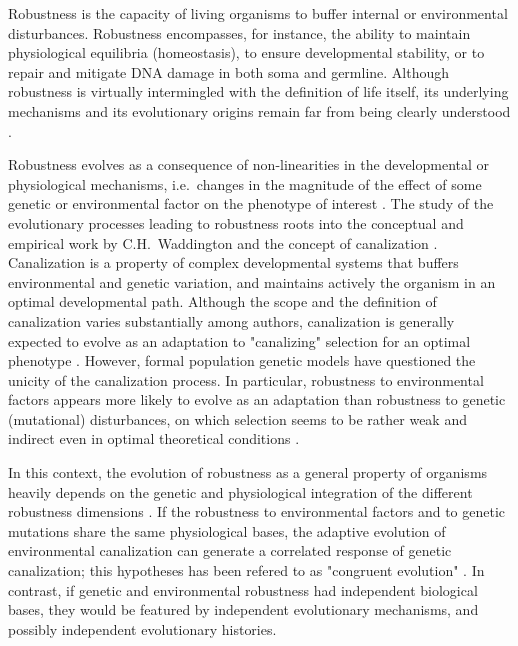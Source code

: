\documentclass[10pt,a4paper]{article}
\begin{document}
Robustness is the capacity of living organisms to buffer internal or environmental disturbances. Robustness encompasses, for instance, the ability to maintain physiological equilibria (homeostasis), to ensure developmental stability, or to repair and mitigate DNA damage in both soma and germline. Although robustness is virtually intermingled with the definition of life itself, its underlying mechanisms and its evolutionary origins remain far from being clearly understood \citep{Ste02,MS09,Wag13,HGK+19}. 

Robustness evolves as a consequence of non-linearities in the developmental or physiological mechanisms, i.e.\ changes in the magnitude of the effect of some genetic or environmental factor on the phenotype of interest \citep{Nij02}. The study of the evolutionary processes leading to robustness roots into the conceptual and empirical work by C.H.\ Waddington and the concept of canalization \citep{Wad42,Sch49,Wad59,Loi19}. Canalization is a property of complex developmental systems that buffers environmental and genetic variation, and maintains actively the organism in an optimal developmental path. Although the scope and the definition of canalization varies substantially among authors, canalization is generally expected to evolve as an adaptation to "canalizing" selection for an optimal phenotype \citep{EM98,DD01,Fla05,Kli19}. However, formal population genetic models have questioned the unicity of the canalization process. In particular, robustness to environmental factors appears more likely to evolve as an adaptation than robustness to genetic (mutational) disturbances, on which selection seems to be rather weak and indirect even in optimal theoretical conditions \citep{WBB97, HHW03,LAH13}. 

In this context, the evolution of robustness as a general property of organisms heavily depends on the genetic and physiological integration of the different robustness dimensions \citep{Far15}. If the robustness to environmental factors and to genetic mutations share the same physiological bases, the adaptive evolution of environmental canalization can generate a correlated response of genetic canalization; this hypotheses has been refered to as "congruent evolution" \citep{dHW+03}. In contrast, if genetic and environmental robustness had independent biological bases, they would be featured by independent evolutionary mechanisms, and possibly independent evolutionary histories. 
\end{document}
